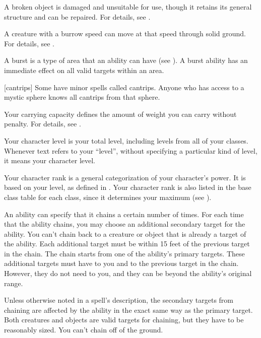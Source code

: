  A broken object is damaged and unsuitable for use, though it retains its general structure and can be repaired.
For details, see .

 A creature with a burrow speed can move at that speed through solid ground.
For details, see .

 A burst is a type of area that an ability can have (see ).
A burst ability has an immediate effect on all valid targets within an area.

[cantrips] Some  have minor spells called cantrips.
Anyone who has access to a mystic sphere knows all cantrips from that sphere.

 Your carrying capacity defines the amount of weight you can carry without penalty.
For details, see .

 Your character level is your total level, including levels from all of your classes.
Whenever text refers to your ``level'', without specifying a particular kind of level, it means your character level.

 Your character rank is a general categorization of your character's power.
It is based on your level, as defined in .
Your character rank is also listed in the base class table for each class, since it determines your maximum  (see ).

 An ability can specify that it chains a certain number of times.
For each time that the ability chains, you may choose an additional secondary target for the ability.
You can't chain back to a creature or object that is already a target of the ability.
Each additional target must be within 15 feet of the previous target in the chain.
The chain starts from one of the ability's primary targets.
These additional targets must have  to you and  to the previous target in the chain.
However, they do not need  to you, and they can be beyond the ability's original range.

Unless otherwise noted in a spell's description, the secondary targets from chaining are affected by the ability in the exact same way as the primary target.
Both creatures and objects are valid targets for chaining, but they have to be reasonably sized.
You can't chain off of the ground.

